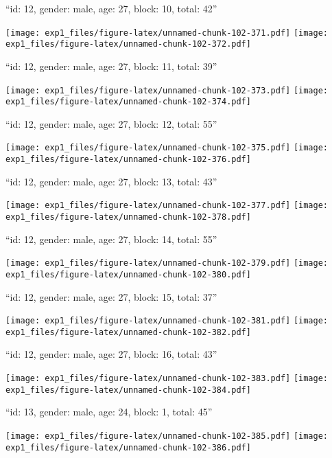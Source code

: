 \documentclass[11pt,,]{article}
\begin{document}
\newpage
[1] 

``id: 12, gender: male, age: 27, block: 10, total: 42''

\texttt{[image: exp1\_files/figure-latex/unnamed-chunk-102-371.pdf]}
\texttt{[image: exp1\_files/figure-latex/unnamed-chunk-102-372.pdf]}

\newpage
[1] 

``id: 12, gender: male, age: 27, block: 11, total: 39''

\texttt{[image: exp1\_files/figure-latex/unnamed-chunk-102-373.pdf]}
\texttt{[image: exp1\_files/figure-latex/unnamed-chunk-102-374.pdf]}

\newpage
[1] 

``id: 12, gender: male, age: 27, block: 12, total: 55''

\texttt{[image: exp1\_files/figure-latex/unnamed-chunk-102-375.pdf]}
\texttt{[image: exp1\_files/figure-latex/unnamed-chunk-102-376.pdf]}

\newpage
[1] 

``id: 12, gender: male, age: 27, block: 13, total: 43''

\texttt{[image: exp1\_files/figure-latex/unnamed-chunk-102-377.pdf]}
\texttt{[image: exp1\_files/figure-latex/unnamed-chunk-102-378.pdf]}

\newpage
[1] 

``id: 12, gender: male, age: 27, block: 14, total: 55''

\texttt{[image: exp1\_files/figure-latex/unnamed-chunk-102-379.pdf]}
\texttt{[image: exp1\_files/figure-latex/unnamed-chunk-102-380.pdf]}

\newpage
[1] 

``id: 12, gender: male, age: 27, block: 15, total: 37''

\texttt{[image: exp1\_files/figure-latex/unnamed-chunk-102-381.pdf]}
\texttt{[image: exp1\_files/figure-latex/unnamed-chunk-102-382.pdf]}

\newpage
[1] 

``id: 12, gender: male, age: 27, block: 16, total: 43''

\texttt{[image: exp1\_files/figure-latex/unnamed-chunk-102-383.pdf]}
\texttt{[image: exp1\_files/figure-latex/unnamed-chunk-102-384.pdf]}

\newpage
[1] 

``id: 13, gender: male, age: 24, block: 1, total: 45''

\texttt{[image: exp1\_files/figure-latex/unnamed-chunk-102-385.pdf]}
\texttt{[image: exp1\_files/figure-latex/unnamed-chunk-102-386.pdf]}
\end{document}
